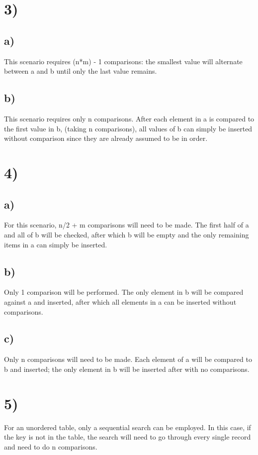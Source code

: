 \documentclass[a4paper,11pt]{article}
\begin{document}
\section*{3)}
\subsection*{a)}
This scenario requires (n*m) - 1 comparisons: the smallest value will alternate between a and b until only the last value remains.  

\subsection*{b)}
This scenario requires only n comparisons.  After each element in a is compared to the first value in b, (taking n
comparisons), all values of b can simply be inserted without comparison since they are already assumed to be in order.


\section*{4)}
\subsection*{a)}
For this scenario, n/2 + m comparisons will need to be made.  The first half of a and all of b will be checked, after which
b will be empty and the only remaining items in a can simply be inserted. 

\subsection*{b)}
Only 1 comparison will be performed.  The only element in b will be compared against a and inserted, after which 
all elements in a can be inserted without comparisons. 

\subsection*{c)}
Only n comparisons will need to be made.  Each element of a will be compared to b and inserted; the only element 
in b will be inserted after with no comparisons.


\section*{5)}
For an unordered table, only a sequential search can be employed.  In this case, if the key is not in the table, the search
will need to go through every single record and need to do n comparisons.
\end{document}
